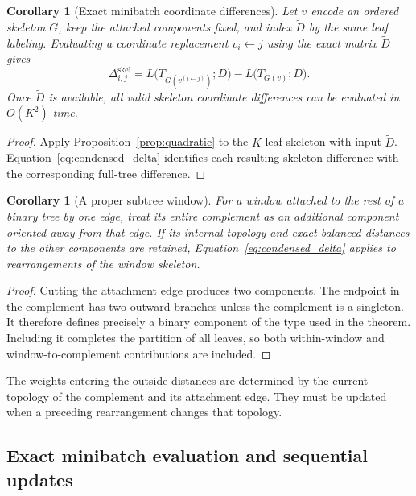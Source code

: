 \documentclass[11pt,a4paper]{article}
\makeatletter
\DeclareRobustCommand{\_}{\ifmmode\nfss@text{\textunderscore}\else\textunderscore\allowbreak\fi}
\newtheorem{corollary}[theorem]{Corollary}
\theoremstyle{definition}
\makeatother
\begin{document}
\begin{corollary}[Exact minibatch coordinate differences]
\label{cor:minibatch_gradient}
Let $v$ encode an ordered skeleton $G$, keep the attached components fixed, and index $\widetilde D$ by the same leaf labeling.
Evaluating a coordinate replacement $v_i\leftarrow j$ using the exact matrix $\widetilde D$ gives
\begin{equation}
 \Delta^{\mathrm{skel}}_{i,j}
 =L\bigl(T_{G(v^{(i\leftarrow j)})};D\bigr)
  -L\bigl(T_{G(v)};D\bigr).
 \label{eq:minibatch_gradient}
\end{equation}
Once $\widetilde D$ is available, all valid skeleton coordinate differences can be evaluated in $O(K^2)$ time.
\end{corollary}
\begin{proof}
Apply Proposition~\ref{prop:quadratic} to the $K$-leaf skeleton with input $\widetilde D$.
Equation~\eqref{eq:condensed_delta} identifies each resulting skeleton difference with the corresponding full-tree difference.
\end{proof}

\begin{corollary}[A proper subtree window]
\label{cor:outside}
For a window attached to the rest of a binary tree by one edge, treat its entire complement as an additional component oriented away from that edge.
If its internal topology and exact balanced distances to the other components are retained, Equation~\eqref{eq:condensed_delta} applies to rearrangements of the window skeleton.
\end{corollary}
\begin{proof}
Cutting the attachment edge produces two components.
The endpoint in the complement has two outward branches unless the complement is a singleton.
It therefore defines precisely a binary component of the type used in the theorem.
Including it completes the partition of all leaves, so both within-window and window-to-complement contributions are included.
\end{proof}

The weights entering the outside distances are determined by the current topology of the complement and its attachment edge.
They must be updated when a preceding rearrangement changes that topology.

\subsection{Exact minibatch evaluation and sequential updates}
\label{sec:acceptance}
\end{document}
